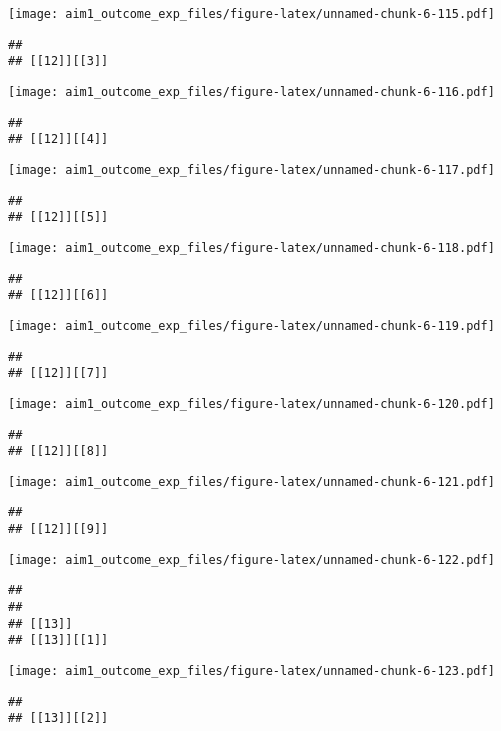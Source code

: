 \documentclass[
]{article}
\begin{document}
\texttt{[image: aim1\_outcome\_exp\_files/figure-latex/unnamed-chunk-6-115.pdf]}

\begin{verbatim}
## 
## [[12]][[3]]
\end{verbatim}

\texttt{[image: aim1\_outcome\_exp\_files/figure-latex/unnamed-chunk-6-116.pdf]}

\begin{verbatim}
## 
## [[12]][[4]]
\end{verbatim}

\texttt{[image: aim1\_outcome\_exp\_files/figure-latex/unnamed-chunk-6-117.pdf]}

\begin{verbatim}
## 
## [[12]][[5]]
\end{verbatim}

\texttt{[image: aim1\_outcome\_exp\_files/figure-latex/unnamed-chunk-6-118.pdf]}

\begin{verbatim}
## 
## [[12]][[6]]
\end{verbatim}

\texttt{[image: aim1\_outcome\_exp\_files/figure-latex/unnamed-chunk-6-119.pdf]}

\begin{verbatim}
## 
## [[12]][[7]]
\end{verbatim}

\texttt{[image: aim1\_outcome\_exp\_files/figure-latex/unnamed-chunk-6-120.pdf]}

\begin{verbatim}
## 
## [[12]][[8]]
\end{verbatim}

\texttt{[image: aim1\_outcome\_exp\_files/figure-latex/unnamed-chunk-6-121.pdf]}

\begin{verbatim}
## 
## [[12]][[9]]
\end{verbatim}

\texttt{[image: aim1\_outcome\_exp\_files/figure-latex/unnamed-chunk-6-122.pdf]}

\begin{verbatim}
## 
## 
## [[13]]
## [[13]][[1]]
\end{verbatim}

\texttt{[image: aim1\_outcome\_exp\_files/figure-latex/unnamed-chunk-6-123.pdf]}

\begin{verbatim}
## 
## [[13]][[2]]
\end{verbatim}
\end{document}
